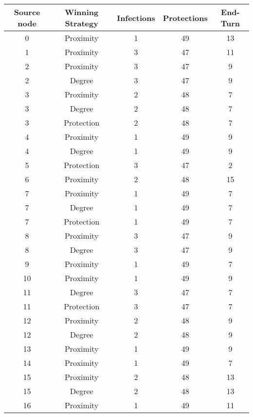 \documentclass[results.tex]{subfiles}
\begin{document}
\begin{center}
  \begin{tabular}{| c || c | c | c | c |}
    \hline
    {\bfseries Source node} & {\bfseries Winning Strategy} & {\bfseries Infections} & {\bfseries Protections} & {\bfseries End-Turn} \\  %
    \hline\hline
    0 & Proximity & 1 & 49 & 13 \\ 
    \hline
    1 & Proximity & 3 & 47 & 11 \\ 
    \hline
    2 & Proximity & 3 & 47 & 9 \\ 
    \hline
    2 & Degree & 3 & 47 & 9 \\ 
    \hline
    3 & Proximity & 2 & 48 & 7 \\ 
    \hline
    3 & Degree & 2 & 48 & 7 \\ 
    \hline
    3 & Protection & 2 & 48 & 7 \\ 
    \hline
    4 & Proximity & 1 & 49 & 9 \\ 
    \hline
    4 & Degree & 1 & 49 & 9 \\ 
    \hline
    5 & Protection & 3 & 47 & 2 \\ 
    \hline
    6 & Proximity & 2 & 48 & 15 \\ 
    \hline
    7 & Proximity & 1 & 49 & 7 \\ 
    \hline
    7 & Degree & 1 & 49 & 7 \\ 
    \hline
    7 & Protection & 1 & 49 & 7 \\ 
    \hline
    8 & Proximity & 3 & 47 & 9 \\ 
    \hline
    8 & Degree & 3 & 47 & 9 \\ 
    \hline
    9 & Proximity & 1 & 49 & 7 \\ 
    \hline
    10 & Proximity & 1 & 49 & 9 \\ 
    \hline
    11 & Degree & 3 & 47 & 7 \\ 
    \hline
    11 & Protection & 3 & 47 & 7 \\ 
    \hline
    12 & Proximity & 2 & 48 & 9 \\ 
    \hline
    12 & Degree & 2 & 48 & 9 \\ 
    \hline
    13 & Proximity & 1 & 49 & 9 \\ 
    \hline
    14 & Proximity & 1 & 49 & 7 \\ 
    \hline
    15 & Proximity & 2 & 48 & 13 \\ 
    \hline
    15 & Degree & 2 & 48 & 13 \\ 
    \hline
    16 & Proximity & 1 & 49 & 11 \\ 

\end{tabular}
\end{center}
\end{document}
